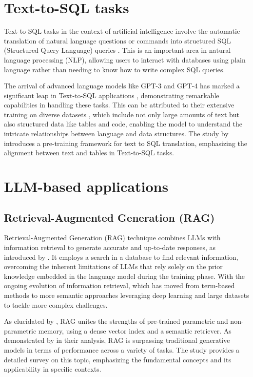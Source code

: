     \section{Text-to-SQL tasks} 

        Text-to-SQL tasks in the context of artificial intelligence involve the automatic translation of natural language questions or commands into structured SQL (Structured Query Language) queries \citep{Qin2022}. This is an important area in natural language processing (NLP), allowing users to interact with databases using plain language rather than needing to know how to write complex SQL queries.         
        
        The arrival of advanced language models like GPT-3 and GPT-4 \citep{OpenAImodels} has marked a significant leap in Text-to-SQL applications \citep{Singh2023}, demonstrating remarkable capabilities in handling these tasks. This can be attributed to their extensive training on diverse datasets \citep{Deng2021}, which include not only large amounts of text but also structured data like tables and code, enabling the model to understand the intricate relationships between language and data structures. The study by \citep{Deng2023} introduces a pre-training framework for text to SQL translation, emphasizing the alignment between text and tables in Text-to-SQL tasks.


    \section{LLM-based applications}

        \subsection{Retrieval-Augmented Generation (RAG)} 

            Retrieval-Augmented Generation (RAG) technique combines LLMs with information retrieval to generate accurate and up-to-date responses, as introduced by \citet{Lewis2020}. It employs a search in a database to find relevant information, overcoming the inherent limitations of LLMs that rely solely on the prior knowledge embedded in the language model during the training phase. 
            With the ongoing evolution of information retrieval, which has moved from term-based methods to more semantic approaches leveraging deep learning and large datasets to tackle more complex challenges.
            
            As elucidated by \citet{Lewis2020}, RAG unites the strengths of pre-trained parametric and non-parametric memory, using a dense vector index and a semantic retriever. 
            As demonstrated by \citet{Li2022} in their analysis, RAG is surpassing traditional generative models in terms of performance across a variety of tasks. The study provides a detailed survey on this topic, emphasizing the fundamental concepts and its applicability in specific contexts.

